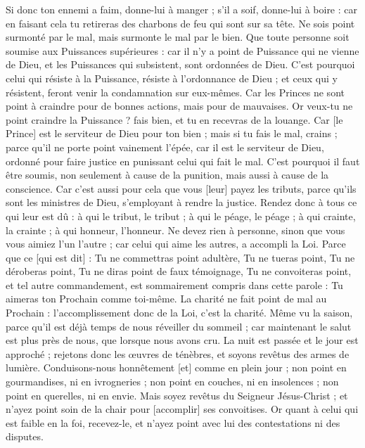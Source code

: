 \begin{multicols}{2}
Si donc ton ennemi a faim, donne-lui à manger ; s'il a soif, donne-lui à boire : car en faisant cela tu retireras des charbons de feu qui sont sur sa tête.
Ne sois point surmonté par le mal, mais surmonte le mal par le bien.
\VerseOne{}Que toute personne soit soumise aux Puissances supérieures : car il n'y a point de Puissance qui ne vienne de Dieu, et les Puissances qui subsistent, sont ordonnées de Dieu.
C'est pourquoi celui qui résiste à la Puissance, résiste à l'ordonnance de Dieu ; et ceux qui y résistent, feront venir la condamnation sur eux-mêmes.
Car les Princes ne sont point à craindre pour de bonnes actions, mais pour de mauvaises. Or veux-tu ne point craindre la Puissance ? fais bien, et tu en recevras de la louange.
Car [le Prince] est le serviteur de Dieu pour ton bien ; mais si tu fais le mal, crains ; parce qu'il ne porte point vainement l'épée, car il est le serviteur de Dieu, ordonné pour faire justice en punissant celui qui fait le mal.
C'est pourquoi il faut être soumis, non seulement à cause de la punition, mais aussi à cause de la conscience.
Car c'est aussi pour cela que vous [leur] payez les tributs, parce qu'ils sont les ministres de Dieu, s'employant à rendre la justice.
Rendez donc à tous ce qui leur est dû : à qui le tribut, le tribut ; à qui le péage, le péage ; à qui crainte, la crainte ; à qui honneur, l'honneur.
Ne devez rien à personne, sinon que vous vous aimiez l'un l'autre ; car celui qui aime les autres, a accompli la Loi.
Parce que ce [qui est dit] : Tu ne commettras point adultère, Tu ne tueras point, Tu ne déroberas point, Tu ne diras point de faux témoignage, Tu ne convoiteras point, et tel autre commandement, est sommairement compris dans cette parole : Tu aimeras ton Prochain comme toi-même.
La charité ne fait point de mal au Prochain : l'accomplissement donc de la Loi, c'est la charité.
Même vu la saison, parce qu'il est déjà temps de nous réveiller du sommeil ; car maintenant le salut est plus près de nous, que lorsque nous avons cru.
La nuit est passée et le jour est approché ; rejetons donc les œuvres de ténèbres, et soyons revêtus des armes de lumière.
Conduisons-nous honnêtement [et] comme en plein jour ; non point en gourmandises, ni en ivrogneries ; non point en couches, ni en insolences ; non point en querelles, ni en envie.
Mais soyez revêtus du Seigneur Jésus-Christ ; et n'ayez point soin de la chair pour [accomplir] ses convoitises.
\VerseOne{}Or quant à celui qui est faible en la foi, recevez-le, et n'ayez point avec lui des contestations ni des disputes.

\end{multicols}
